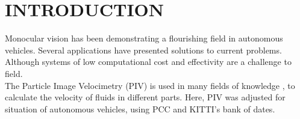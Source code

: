 \section{INTRODUCTION}

Monocular vision has been demonstrating a flourishing field in autonomous vehicles. Several applications have presented  
solutions to current problems. Although systems of low computational cost and effectivity are a challenge to field. \\
The Particle Image Velocimetry (PIV)\cite{Bastiaans} is used in many fields of knowledge \cite{Story, Xu}, to calculate 
the velocity of fluids in different parts. Here, PIV was adjusted for situation of autonomous vehicles, using PCC
\cite{Miranda Neto} and KITTI's bank of dates\cite{Geiger}.\\
